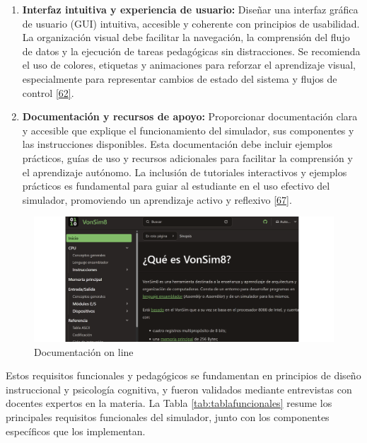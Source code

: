 \documentclass[12pt,oneside]{templates/unerthesis}
\begin{document}
\begin{enumerate}
\def\labelenumi{\arabic{enumi}.}
\setcounter{enumi}{6}
\item
  \textbf{Interfaz intuitiva y experiencia de usuario:}
  Diseñar una interfaz gráfica de usuario (GUI) intuitiva, accesible y coherente con principios de usabilidad. La organización visual debe facilitar la navegación, la comprensión del flujo de datos y la ejecución de tareas pedagógicas sin distracciones. Se recomienda el uso de colores, etiquetas y animaciones para reforzar el aprendizaje visual, especialmente para representar cambios de estado del sistema y flujos de control \protect\hyperlink{ref-w3c_accessibility_2021}{{[}62{]}}.
\item
  \textbf{Documentación y recursos de apoyo:}
  Proporcionar documentación clara y accesible que explique el funcionamiento del simulador, sus componentes y las instrucciones disponibles. Esta documentación debe incluir ejemplos prácticos, guías de uso y recursos adicionales para facilitar la comprensión y el aprendizaje autónomo. La inclusión de tutoriales interactivos y ejemplos prácticos es fundamental para guiar al estudiante en el uso efectivo del simulador, promoviendo un aprendizaje activo y reflexivo \protect\hyperlink{ref-bonwell1991active}{{[}67{]}}.
\end{enumerate}

\begin{figure}

{\centering \includegraphics[width=0.9\linewidth]{images/documentacion} 

}

\caption{Documentación on line}\label{fig:documentacion}
\end{figure}

Estos requisitos funcionales y pedagógicos se fundamentan en principios de diseño instruccional y psicología cognitiva, y fueron validados mediante entrevistas con docentes expertos en la materia. La Tabla \ref{tab:tablafuncionales} resume los principales requisitos funcionales del simulador, junto con los componentes específicos que los implementan.
\end{document}
